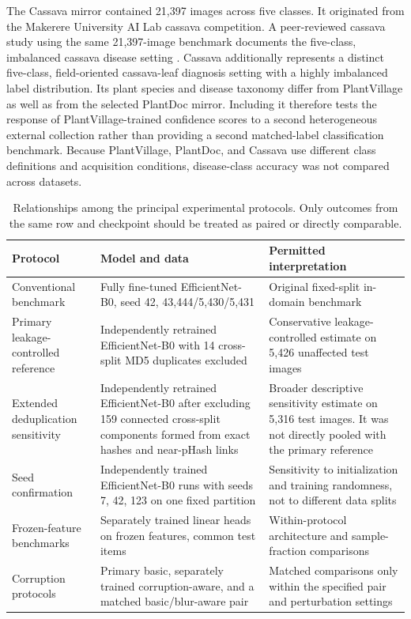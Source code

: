 \documentclass{sbc2023}%
\begin{document}
The Cassava mirror contained 21,397 images across five classes. It originated from the Makerere University AI Lab cassava competition. A peer-reviewed cassava study using the same 21,397-image benchmark documents the five-class, imbalanced cassava disease setting \cite{r03}. Cassava additionally represents a distinct five-class, field-oriented cassava-leaf diagnosis setting with a highly imbalanced label distribution. Its plant species and disease taxonomy differ from PlantVillage as well as from the selected PlantDoc mirror. Including it therefore tests the response of PlantVillage-trained confidence scores to a second heterogeneous external collection rather than providing a second matched-label classification benchmark. Because PlantVillage, PlantDoc, and Cassava use different class definitions and acquisition conditions, disease-class accuracy was not compared across datasets.

\begin{table}[!t]
\centering
\caption{Relationships among the principal experimental protocols. Only outcomes from the same row and checkpoint should be treated as paired or directly comparable.}
\label{tab:protocol_map}
\small
\begin{tabular}{p{}p{}p{}}
\toprule
Protocol & Model and data & Permitted interpretation \\
\midrule
Conventional benchmark & Fully fine-tuned EfficientNet-B0, seed 42, 43,444/5,430/5,431 & Original fixed-split in-domain benchmark \\
Primary leakage-controlled reference & Independently retrained EfficientNet-B0 with 14 cross-split MD5 duplicates excluded & Conservative leakage-controlled estimate on 5,426 unaffected test images \\
Extended deduplication sensitivity & Independently retrained EfficientNet-B0 after excluding 159 connected cross-split components formed from exact hashes and near-pHash links & Broader descriptive sensitivity estimate on 5,316 test images. It was not directly pooled with the primary reference \\
Seed confirmation & Independently trained EfficientNet-B0 runs with seeds 7, 42, 123 on one fixed partition & Sensitivity to initialization and training randomness, not to different data splits \\
Frozen-feature benchmarks & Separately trained linear heads on frozen features, common test items & Within-protocol architecture and sample-fraction comparisons \\
Corruption protocols & Primary basic, separately trained corruption-aware, and a matched basic/blur-aware pair & Matched comparisons only within the specified pair and perturbation settings \\
\bottomrule
\end{tabular}
\end{table}
\end{document}
